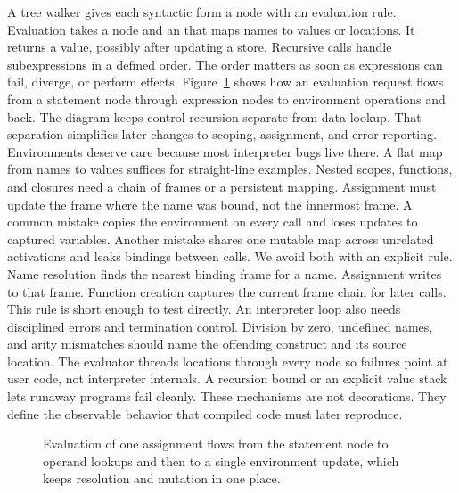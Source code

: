 A tree walker gives each syntactic form a node with an evaluation rule.
Evaluation takes a node and an  that maps names to values or locations.
It returns a value, possibly after updating a store.
Recursive calls handle subexpressions in a defined order.
The order matters as soon as expressions can fail, diverge, or perform effects.
Figure~\ref{fig:ch30-eval-flow} shows how an evaluation request flows from a statement node through expression nodes to environment operations and back.
The diagram keeps control recursion separate from data lookup.
That separation simplifies later changes to scoping, assignment, and error reporting.
Environments deserve care because most interpreter bugs live there.
A flat map from names to values suffices for straight-line examples.
Nested scopes, functions, and closures need a chain of frames or a persistent mapping.
Assignment must update the frame where the name was bound, not the innermost frame.
A common mistake copies the environment on every call and loses updates to captured variables.
Another mistake shares one mutable map across unrelated activations and leaks bindings between calls.
We avoid both with an explicit rule.
Name resolution finds the nearest binding frame for a name.
Assignment writes to that frame.
Function creation captures the current frame chain for later calls.
This rule is short enough to test directly.
An interpreter loop also needs disciplined errors and termination control.
Division by zero, undefined names, and arity mismatches should name the offending construct and its source location.
The evaluator threads locations through every node so failures point at user code, not interpreter internals.
A recursion bound or an explicit value stack lets runaway programs fail cleanly.
These mechanisms are not decorations.
They define the observable behavior that compiled code must later reproduce.

\begin{figure}[htbp]
\centering
{}
\caption{Evaluation of one assignment flows from the statement node to operand lookups and then to a single environment update, which keeps resolution and mutation in one place.}
\label{fig:ch30-eval-flow}
\end{figure}

